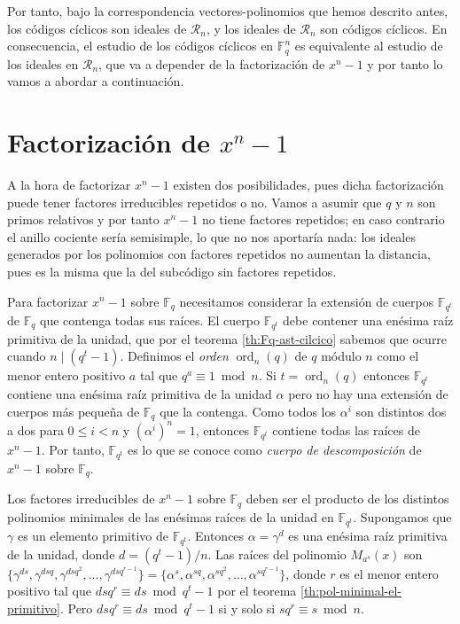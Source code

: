 Por tanto, bajo la correspondencia vectores-polinomios que hemos descrito antes, los códigos cíclicos son ideales de \(\mathcal R_n\), y los ideales de \(\mathcal R_n\) son códigos cíclicos.
En consecuencia, el estudio de los códigos cíclicos en \(\mathbb F_q^n\) es equivalente al estudio de los ideales en \(\mathcal R_n\), que va a depender de la factorización de \(x^n-1\) y por tanto lo vamos a abordar a continuación.

\section{Factorización de \texorpdfstring{\(x^n -1\)}{xn - 1}}

\label{sec:factorizacion-xn-1}

A la hora de factorizar \(x^n -1\) existen dos posibilidades, pues dicha factorización puede tener factores irreducibles repetidos o no.
Vamos a asumir que \(q\) y \(n\) son primos relativos y por tanto \(x^n - 1\) no tiene factores repetidos; en caso contrario el anillo cociente sería semisimple, lo que no nos aportaría nada: los ideales generados por los polinomios con factores repetidos no aumentan la distancia, pues es la misma que la del subcódigo sin factores repetidos.

Para factorizar \(x^n - 1\) sobre \(\mathbb F_q\) necesitamos considerar la extensión de cuerpos \(\mathbb F_{q^t}\) de \(\mathbb F_q\) que contenga todas sus raíces.
El cuerpo \(\mathbb F_{q^t}\) debe contener una enésima raíz primitiva de la unidad, que por el teorema \ref{th:Fq-ast-cilcico} sabemos que ocurre cuando \(n \mid (q^t - 1)\).
Definimos el \textit{orden} \(\operatorname{ord}_n(q)\) de \(q\) módulo \(n\) como el menor entero positivo \(a\) tal que \(q^{a} \equiv 1 \bmod n\).
Si \(t = \operatorname{ord}_n(q)\) entonces \(\mathbb F_{q^t}\) contiene una enésima raíz primitiva de la unidad \(\alpha\) pero no hay una extensión de cuerpos más pequeña de \(\mathbb F_q\) que la contenga.
Como todos los \(\alpha^{i}\) son distintos dos a dos para \(0 \leq i < n\) y \((\alpha^{i})^n = 1\), entonces \(\mathbb F_{q^t}\) contiene todas las raíces de \(x^n - 1\).
Por tanto, \(\mathbb F_{q^t}\) es lo que se conoce como \textit{cuerpo de descomposición} de \(x^n - 1\) sobre \(\mathbb F_q\).

Los factores irreducibles de \(x^n - 1\) sobre \(\mathbb F_q\) deben ser el producto de los distintos polinomios minimales de las enésimas raíces de la unidad en \(\mathbb F_{q^t}\).
Supongamos que \(\gamma\) es un elemento primitivo de \(\mathbb F_{q^t}\).
Entonces \(\alpha = \gamma^d\) es una enésima raíz primitiva de la unidad, donde \(d = (q^t - 1)/n\).
Las raíces del polinomio \(M_{a^s}(x)\) son \(\{\gamma^{ds}, \gamma^{dsq}, \gamma^{dsq^2}, \dots, \gamma^{dsq^{r-1}}\} = \{\alpha^s, \alpha^{sq}, \alpha^{sq^2}, \dots, \alpha^{sq^{r-1}}\}\), donde \(r\) es el menor entero positivo tal que \(dsq^r \equiv ds \bmod q^t - 1\) por el teorema \ref{th:pol-minimal-el-primitivo}.
Pero \(dsq^r \equiv ds \bmod q^t - 1\) si y solo si \(sq^r \equiv s \bmod n\).

